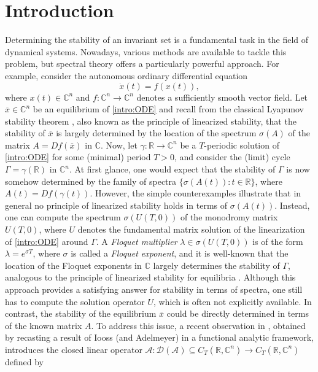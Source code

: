 \documentclass[english]{myarticle}
\begin{document}
\begin{sloppypar}
\section{Introduction} \label{sec:introduction}
Determining the stability of an invariant set is a fundamental task in the field of dynamical systems. Nowadays, various methods are available to tackle this problem, but spectral theory offers a particularly powerful approach. For example, consider the autonomous ordinary differential equation
\begin{equation} \tag{ODE} \label{intro:ODE}
    \dot{x}(t) = f(x(t)),
\end{equation}
where $x(t) \in \mathbb{C}^n$ and $f : \mathbb{C}^n \to \mathbb{C}^n$ denotes a sufficiently smooth vector field. Let $\overline{x} \in \mathbb{C}^n$ be an equilibrium of \eqref{intro:ODE} and recall from the classical Lyapunov stability theorem \cite{Lyapunov1892}, also known as the principle of linearized stability, that the stability of $\overline{x}$ is largely determined by the location of the spectrum $\sigma(A)$ of the matrix $A = Df(\overline{x})$ in $\mathbb{C}$. Now, let $\gamma : \mathbb{R} \to \mathbb{C}^n$ be a $T$-periodic solution of \eqref{intro:ODE} for some (minimal) period $T > 0$, and consider the (limit) cycle $\Gamma = \gamma(\mathbb{R})$ in $\mathbb{C}^n$. At first glance, one would expect that the stability of $\Gamma$ is now somehow determined by the family of spectra $\{\sigma(A(t)) : t \in \mathbb{R}\}$, where $A(t) = Df(\gamma(t))$. However, the simple counterexamples \cite{Coppel1978,Wu1974} illustrate that in general no principle of linearized stability holds in terms of $\sigma(A(t))$. Instead, one can compute the spectrum $\sigma(U(T,0))$ of the monodromy matrix $U(T,0)$, where $U$ denotes the fundamental matrix solution of the linearization of \eqref{intro:ODE} around $\Gamma$. A \emph{Floquet multiplier} $\lambda \in \sigma(U(T,0))$ is of the form $\lambda = e^{\sigma T}$, where $\sigma$ is called a \emph{Floquet exponent}, and it is well-known that the location of the Floquet exponents in $\mathbb{C}$ largely determines the stability of $\Gamma$, analogous to the principle of linearized stability for equilibria \cite{Hale2009}. Although this approach provides a satisfying answer for stability in terms of spectra, one still has to compute the solution operator $U$, which is often not explicitly available. In contrast, the stability of the equilibrium $\overline{x}$ could be directly determined in terms of the known matrix $A$. To address this issue, a recent observation in \cite{Article2}, obtained by recasting a result of Iooss (and Adelmeyer) \cite{Iooss1988,Iooss1999} in a functional analytic framework, introduces the closed linear operator $\mathcal{A} : \mathcal{D}(\mathcal{A}) \subseteq C_T(\mathbb{R},\mathbb{C}^n) \to C_T(\mathbb{R},\mathbb{C}^n)$ defined by

\end{sloppypar}
\end{document}

